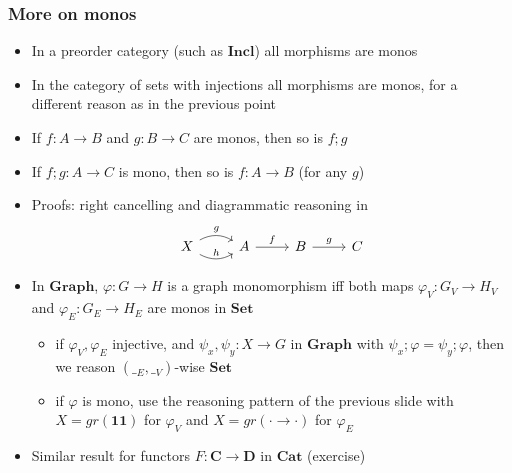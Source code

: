 \documentclass[handout]{beamer}
\newcommand{\bfsf}[1]{{\boldsymbol{#1}}}
\newcommand{\Set}{\bfsf{Set}}
\newcommand{\Gra}{\bfsf{Graph}}
\newcommand{\CC}{\bfsf{C}}
\newcommand{\DD}{\bfsf{D}}
\newcommand{\Incl}{\bfsf{Incl}}
\newcommand{\Cat}{\bfsf{Cat}}
\begin{document}
\frame
  {   
    \frametitle{More on monos}\label{Ch4:Moronmonos}

 \begin{itemize}[<+->]
\item In a preorder category (such as $\Incl$) all morphisms are monos
\item In the category of sets with injections all morphisms are monos,
for a different reason as in the previous point
\item If $f:A\to B$ and $g:B\to C$ are monos, then so is $f;g$
\item If $f;g: A\to C$ is mono, then so is $f:A\to B$ (for any $g$)
\item Proofs: right cancelling and diagrammatic reasoning in
\[
\begin{tikzcd}[ampersand replacement=\&]
X \arrow[bend left]{r}{g}\arrow[bend right]{r}{h} \& 
A \arrow{r}{f}\& B \arrow{r}{g} \& C
\end{tikzcd}
\]
\item In $\Gra$, $\varphi: G\to H$ is a graph monomorphism iff both
maps $\varphi_V: G_V\to H_V$ and $\varphi_E: G_E\to H_E$ are monos in $\Set$
 \begin{itemize}
    \item if $\varphi_V,\varphi_E$ injective, and $\psi_x,\psi_y: X\to G$ in $\Gra$
with $\psi_x;\varphi = \psi_y;\varphi$, then we reason $(\__E,\__V)$-wise $\Set$
    \item if $\varphi$ is mono, use the reasoning pattern  of the previous
slide with $X=gr(\bfsf{1\!\!1})$ for $\varphi_V$ and $X=gr({\cdot}{\to}{\cdot})$ for $\varphi_E$
\end{itemize}
\item Similar result for functors $F: \CC\to\DD$ in $\Cat$ (exercise)
 \end{itemize}

 }
\end{document}
